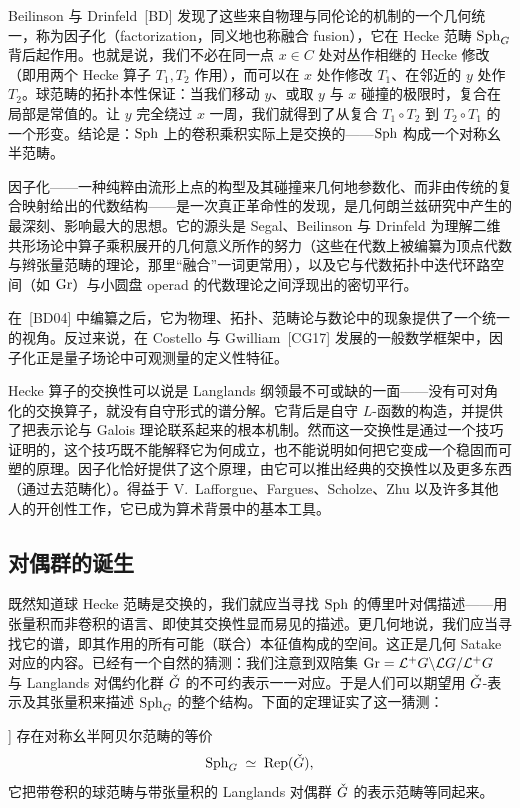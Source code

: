 Beilinson 与 Drinfeld~[BD] 发现了这些来自物理与同伦论的机制的一个几何统一，称为因子化（factorization，同义地也称融合 fusion），它在 Hecke 范畴 $\operatorname{Sph}_{G}$ 背后起作用。也就是说，我们不必在同一点 $x\in C$ 处对丛作相继的 Hecke 修改（即用两个 Hecke 算子 $T_{1},T_{2}$ 作用），而可以在 $x$ 处作修改 $T_{1}$、在邻近的 $y$ 处作 $T_{2}$。球范畴的拓扑本性保证：当我们移动 $y$、或取 $y$ 与 $x$ 碰撞的极限时，复合在局部是常值的。让 $y$ 完全绕过 $x$ 一周，我们就得到了从复合 $T_{1}\circ T_{2}$ 到 $T_{2}\circ T_{1}$ 的一个形变。结论是：$\operatorname{Sph}$ 上的卷积乘积实际上是交换的——$\operatorname{Sph}$ 构成一个对称幺半范畴。

因子化——一种纯粹由流形上点的构型及其碰撞来几何地参数化、而非由传统的复合映射给出的代数结构——是一次真正革命性的发现，是几何朗兰兹研究中产生的最深刻、影响最大的思想。它的源头是 Segal、Beilinson 与 Drinfeld 为理解二维共形场论中算子乘积展开的几何意义所作的努力（这些在代数上被编纂为顶点代数与辫张量范畴的理论，那里“融合”一词更常用），以及它与代数拓扑中迭代环路空间（如 $\operatorname{Gr}$）与小圆盘 operad 的代数理论之间浮现出的密切平行。

在~[BD04] 中编纂之后，它为物理、拓扑、范畴论与数论中的现象提供了一个统一的视角。反过来说，在 Costello 与 Gwilliam~[CG17] 发展的一般数学框架中，因子化正是量子场论中可观测量的定义性特征。

Hecke 算子的交换性可以说是 Langlands 纲领最不可或缺的一面——没有可对角化的交换算子，就没有自守形式的谱分解。它背后是自守 $L$-函数的构造，并提供了把表示论与 Galois 理论联系起来的根本机制。然而这一交换性是通过一个技巧证明的，这个技巧既不能解释它为何成立，也不能说明如何把它变成一个稳固而可塑的原理。因子化恰好提供了这个原理，由它可以推出经典的交换性以及更多东西（通过去范畴化）。得益于 V.~Lafforgue、Fargues、Scholze、Zhu 以及许多其他人的开创性工作，它已成为算术背景中的基本工具。

\subsection{对偶群的诞生}\label{sec:3.3}

既然知道球 Hecke 范畴是交换的，我们就应当寻找 $\operatorname{Sph}$ 的傅里叶对偶描述——用张量积而非卷积的语言、即使其交换性显而易见的描述。更几何地说，我们应当寻找它的谱，即其作用的所有可能（联合）本征值构成的空间。这正是几何 Satake 对应的内容。已经有一个自然的猜测：我们注意到双陪集 $\operatorname{Gr}=\mathcal{L}^{+}G\backslash\mathcal{L}G/\mathcal{L}^{+}G$ 与 Langlands 对偶约化群 $\check{G}$ 的不可约表示一一对应。于是人们可以期望用 $\check{G}$-表示及其张量积来描述 $\operatorname{Sph}_{G}$ 的整个结构。下面的定理证实了这一猜测：

\begin{theorem*}[几何 Satake 对应；[Lus83, Gin, MV07]]\label{thm:satake}
存在对称幺半阿贝尔范畴的等价
\[
\operatorname{Sph}_{G}\;\simeq\;\operatorname{Rep}(\check{G}),
\]
它把带卷积的球范畴与带张量积的 Langlands 对偶群 $\check{G}$ 的表示范畴等同起来。
\end{theorem*}

